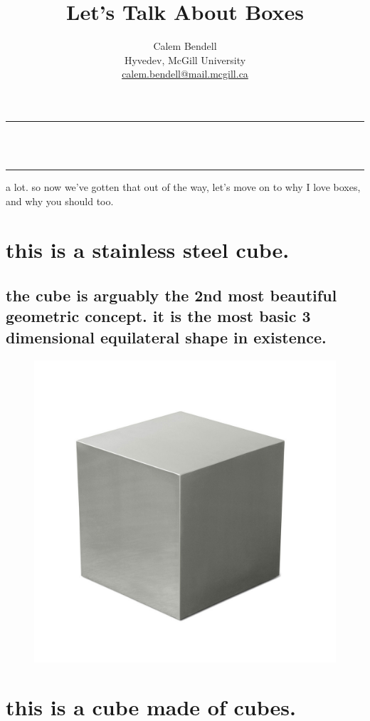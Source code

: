 \documentclass[paper=128mm:96mm, fontsize=9pt, pagesize]{scrartcl}
\title{Let's Talk About Boxes}
\author{
\normalsize
{Calem Bendell} \\
Hyvedev, McGill University \\
\href{mailto:calem.bendell@mail.mcgill.ca}{calem.bendell@mail.mcgill.ca}
}
\date{}
\renewcommand{\maketitle}{\noindent\rule{\linewidth}{1pt}\Huge \vspace{1em} \newline
\sffamily \scshape \thetitle \\
\normalfont \sffamily  \theauthor \\
\thedate
\newline\noindent\rule{\linewidth}{1pt}
\normalfont
\normalsize}
\begin{document}
\maketitle

\clearpage


a lot.
so now we've gotten that out of the way, let's move on to why I love boxes, and why you should too.

\clearpage

\section{this is a stainless steel cube.}
\subsection{the cube is arguably the 2nd most beautiful geometric concept.  it is the most basic 3 dimensional equilateral shape in existence.}
\begin{figure}
	\centering
	\includegraphics[height=.5\textheight]{gfx/cube1.jpg}
\end{figure}

\clearpage

\section{this is a cube made of cubes.}
\end{document}
